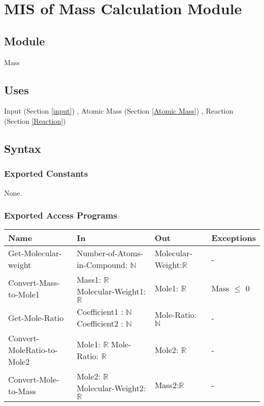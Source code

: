 \documentclass[12pt, titlepage]{article}
\begin{document}
\newpage
  
\section{MIS of Mass Calculation Module} \label{Mass} 

\subsection{Module}

Mass

\subsection{Uses}

Input (Section \ref{input}) , Atomic Mass (Section \ref{Atomic Mass}) , Reaction (Section \ref{Reaction}) 
\subsection{Syntax}

\subsubsection{Exported Constants}

None.

\subsubsection{Exported Access Programs}

\begin{center}
\begin{tabular}{p{2cm} p{4cm} p{4cm} p{2cm}}
\hline
\textbf{Name} & \textbf{In} & \textbf{Out} & \textbf{Exceptions} \\
\hline
{Get-Molecular-weight} & Number-of-Atoms-in-Compound: $\mathbb{N}$ & Molecular-Weight:$\mathbb{R}$ & - \\
\hline
{Convert-Mass-to-Mole1}  & Mass1: $\mathbb{R}$
  \newline Molecular-Weight1: $\mathbb{R}$ & Mole1: $\mathbb{R}$  & Mass $\leq$ 0\\
\hline
{Get-Mole-Ratio}  & Coefficient1 : $\mathbb{N}$
  \newline Coefficient2 : $\mathbb{N}$ & Mole-Ratio: $\mathbb{N}$  & - \\
  \hline
{Convert-MoleRatio-to-Mole2} & Mole1: $\mathbb{R}$
  \newline Mole-Ratio: $\mathbb{R}$ & Mole2: $\mathbb{R}$ & - \\
 \hline
 {Convert-Mole-to-Mass} & Mole2: $\mathbb{R}$
  \newline Molecular-Weight2: $\mathbb{R}$ & Mass2:$\mathbb{R}$ & - \\
\hline
\end{tabular}
\end{center}
\end{document}
